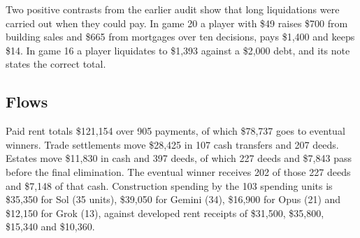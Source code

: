 Two positive contrasts from the earlier audit show that long liquidations were carried out when they could pay. In game 20 a player with \$49 raises \$700 from building sales and \$665 from mortgages over ten decisions, pays \$1,400 and keeps \$14. In game 16 a player liquidates to \$1,393 against a \$2,000 debt, and its note states the correct total.

\subsection{Flows}

Paid rent totals \$121,154 over 905 payments, of which \$78,737 goes to eventual winners. Trade settlements move \$28,425 in 107 cash transfers and 207 deeds. Estates move \$11,830 in cash and 397 deeds, of which 227 deeds and \$7,843 pass before the final elimination. The eventual winner receives 202 of those 227 deeds and \$7,148 of that cash. Construction spending by the 103 spending units is \$35,350 for Sol (35 units), \$39,050 for Gemini (34), \$16,900 for Opus (21) and \$12,150 for Grok (13), against developed rent receipts of \$31,500, \$35,800, \$15,340 and \$10,360.
